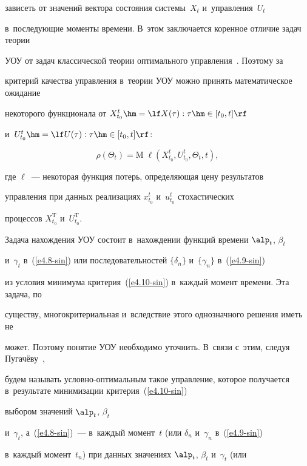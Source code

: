 зависеть от значений вектора состояния сис\-те\-мы~$X_t$ и~управ\-ле\-ния~$U_t$ 

в~последующие моменты времени. В~этом заключается коренное отличие задач теории 

УОУ от задач классической тео\-рии оптимального управ\-ле\-ния~\cite{13-sin, 14-sin}. Поэтому за 

критерий качества управления в~тео\-рии УОУ можно принять математическое ожидание 

некоторого функционала от  $X_{t_0}^t\hm = \lf X(\tau) : \tau \hm\in [ t_0, t]\rf$  

и~$U_{t_0}^t \hm= \lf U(\tau) : \tau \hm\in [ t_0, t]\rf$:

\begin{equation}

\rho (\Theta_t) = \mathrm{M}\; \ell (X_{t_0}^t, U_{t_0}^t,\Theta_t, t),

\label{e4.10-sin}

\end{equation}

где  $\ell$~--- некоторая функция потерь, определяющая цену результатов 

управления при данных реализациях $x_{t_0}^t$ и~$u_{t_0}^t$ стохастических 

процессов $X_{t_0}^{\mathrm{T}}$ и~$U_{t_0}^{\mathrm{T}}$.



Задача нахождения УОУ состоит в~нахождении функций времени  $\alp_t$, $\beta_t$ 

и~$\gamma_t$ в~(\ref{e4.8-sin}) или последовательностей $\{\delta_n\}$ и~$\{ \gamma_n\}$ в~(\ref{e4.9-sin}) 

из условия минимума критерия~(\ref{e4.10-sin}) в~каждый момент времени. Эта задача, по 

существу, многокритериальная и~вследствие этого однозначного решения иметь не 

может. Поэтому понятие УОУ необходимо уточнить. В~связи с~этим, следуя Пугачёву~\cite{5-sin, 6-sin}, 

будем называть услов\-но-оп\-ти\-маль\-ным такое управ\-ле\-ние, которое получается в~результате минимизации критерия~(\ref{e4.10-sin})

 выбором значений  $\alp_t$, $\beta_t$ 

и~$\gamma_t$, а~(\ref{e4.8-sin})~--- в~каждый момент~$t$ (или $\delta_n$ и~$\gamma_n$ в~(\ref{e4.9-sin}) 

в~каждый момент~$t_n$) при данных значениях $\alp_t$, $\beta_t$ и~$\gamma_t$ (или 

